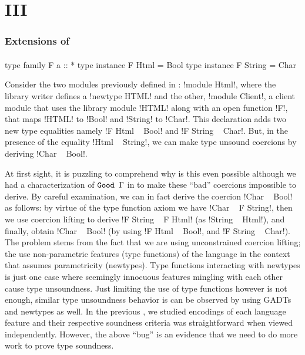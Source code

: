 \documentclass[screen,nonacm,manuscript,review]{acmart} %
\begin{document}
\part{III}\label{part:III}
\section{Extensions of \SFC}\label{sec:fc-extensions}%
\subsection{\SFR}\label{sec:sfr} %

\begin{CenteredBox}
  \begin{code}
    type family F a :: *
    type instance F Html = Bool
    type instance F String = Char
  \end{code}
\end{CenteredBox}

Consider the two modules previously defined in : !module Html!, where the library writer defines a !newtype HTML! and the other, !module Client!, a client module that uses the library module !HTML! along with an open function !F!, that maps !HTML! to !Bool! and !String! to !Char!. This declaration adds two new type equalities namely !F Html ~ Bool! and !F String ~ Char!. But, in the presence of the equality !Html ~ String!, we can make type unsound coercions by deriving !Char ~ Bool!.

At first sight, it is puzzling to comprehend why is this even possible although we had a characterization of $\texttt{Good~}\Gamma$ in  to make these ``bad'' coercions impossible to derive. By careful examination, we can in fact derive the coercion !Char ~ Bool! as follows: by virtue of the type function axiom we have !Char ~ F String!, then we use coercion lifting to derive !F String ~ F Html! (as !String ~ Html!), and finally, obtain !Char ~ Bool! (by using !F Html ~ Bool!, and !F String ~ Char!). The problem stems from the fact that we are using unconstrained coercion lifting; the use non-parametric features (type functions) of the language in the context that assumes parametricity (newtypes). Type functions interacting with newtypes is just one case where seemingly innocuous features mingling with each other cause type unsoundness. Just limiting the use of type functions however is not enough, similar type unsoundness behavior is can be observed by using GADTs and newtypes as well\cite{weirich_generative_2011}. In the previous , we studied \SFC encodings of each language feature and their respective soundness criteria was straightforward when viewed independently. However, the above ``bug'' is an evidence that we need to do more work to prove type soundness.
\end{document}
